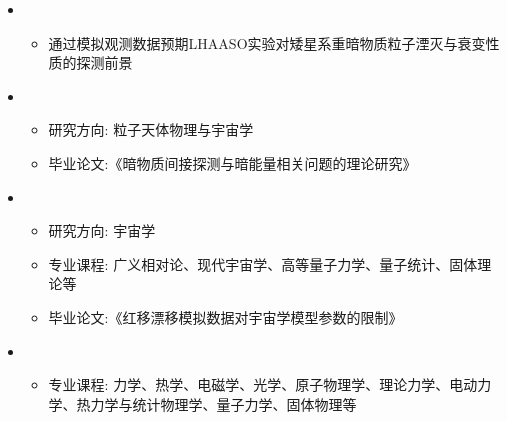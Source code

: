   \begin{itemize}[leftmargin=*]
     \item
      {\small
      \begin{itemize}
         \item 通过模拟观测数据预期LHAASO实验对矮星系重暗物质粒子湮灭与衰变性质的探测前景     
      \end{itemize}
      }
    \item
      {\small
      \begin{itemize}
         \item 研究方向: 粒子天体物理与宇宙学
         \item 毕业论文:《暗物质间接探测与暗能量相关问题的理论研究》
      \end{itemize}
      }
      
     \item    
      {\small
      \begin{itemize}
         \item{研究方向:  宇宙学}
         \item 专业课程: 广义相对论、现代宇宙学、高等量子力学、量子统计、固体理论等       
         \item 毕业论文:《红移漂移模拟数据对宇宙学模型参数的限制》
      \end{itemize}
      }

    \item
      {\small
      \begin{itemize}
         \item 专业课程: 力学、热学、电磁学、光学、原子物理学、理论力学、电动力学、热力学与统计物理学、量子力学、固体物理等
      \end{itemize}
      }
  \end{itemize}